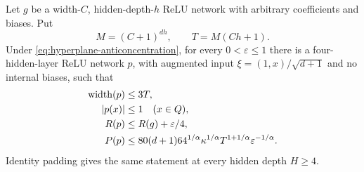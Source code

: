 \begin{theorem}
\label{thm:hyperplane-compiler}
Let $g$ be a width-$C$, hidden-depth-$h$ ReLU network with arbitrary coefficients and biases. Put
\[
 M=(C+1)^{dh},\qquad T=M(Ch+1).
\]
Under \eqref{eq:hyperplane-anticoncentration}, for every $0<\varepsilon\le1$ there is a four-hidden-layer ReLU network $p$, with augmented input $\xi=(1,x)/\sqrt{d+1}$ and no internal biases, such that
\begin{align}
 \operatorname{width}(p)&\le3T,\notag\\
 |p(x)|&\le1\quad(x\in Q),\notag\\
 R(p)&\le R(g)+\varepsilon/4,\label{eq:hyperplane-compiler-risk}\\
 P(p)&\le80(d+1)64^{1/\alpha}
       \kappa^{1/\alpha}T^{1+1/\alpha}\varepsilon^{-1/\alpha}.
 \label{eq:hyperplane-compiler-path}
\end{align}
Identity padding gives the same statement at every hidden depth $H\ge4$.
\end{theorem}
